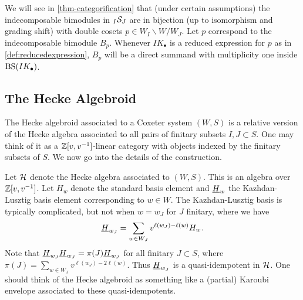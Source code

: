 We will see in \cref{thm-categorification} that (under certain assumptions) the indecomposable bimodules in ${}_{I}\mathcal{S}_{J}$ are in bijection (up to isomorphism and grading shift) with double cosets $p \in W_I \backslash W / W_J$. Let $p$ correspond to the indecomposable bimodule $B_p$. Whenever $IK_{\bullet}$ is a reduced expression for $p$ as in \cref{def:reducedexpression}, $B_p$ will be a direct summand with multiplicity one inside $\operatorname{BS}(IK_{\bullet})$.




\subsection{The Hecke Algebroid}
\label{subsec-Hecke}

The Hecke algebroid associated to a Coxeter system $(W,S)$ is a relative version of the Hecke algebra associated to all pairs of finitary subsets $I, J \subset S$. One may think of it as a $\mathbb{Z}[v,v^{-1}]$-linear category with objects  indexed by the finitary subsets of $S$. 
We now go into the details of the construction.

Let $\mathcal{H}$ denote the Hecke algebra associated to $(W,S)$. This is an algebra over $\mathbb{Z}[v,v^{-1}]$. Let $H_w$ denote the standard basis element and $\underline{H}_w$ the Kazhdan-Lusztig basis element corresponding to $w \in W$. The Kazhdan-Lusztig basis is typically complicated, but not when $w = w_J$ for $J$ finitary, where we have
\[ \underline{H}_{w_J} = \sum_{w \in W_J} v^{\ell(w_J) - \ell(w)} H_w. \]
Note that $\underline{H}_{w_J}\underline{H}_{w_J}=\pi(J)\underline{H}_{w_J}$ for all finitary $J \subset S$, where $\pi(J)=\displaystyle \sum_{w\in W_J}v^{\ell(w_J)-2\ell(w)}.$ Thus $\underline{H}_{w_J}$ is a quasi-idempotent in $\mathcal{H}$. One should think of the Hecke algebroid as something like a (partial) Karoubi envelope associated to these quasi-idempotents.

